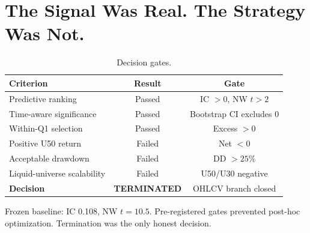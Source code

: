 \section{The Signal Was Real. The Strategy Was Not.}
\begin{table}[htbp]\centering
\caption{Decision gates.}\label{tab:gates}
\begin{tabular}{lcc}
\toprule
\textbf{Criterion} & \textbf{Result} & \textbf{Gate} \\
\midrule
Predictive ranking & Passed & IC $>0$, NW $t>2$ \\
Time-aware significance & Passed & Bootstrap CI excludes 0 \\
Within-Q1 selection & Passed & Excess $>0$ \\
Positive U50 return & Failed & Net $<0$ \\
Acceptable drawdown & Failed & DD $>25\%$ \\
Liquid-universe scalability & Failed & U50/U30 negative \\
\midrule
\textbf{Decision} & \textbf{TERMINATED} & OHLCV branch closed \\
\bottomrule
\end{tabular}
\end{table}
Frozen baseline: IC 0.108, NW $t = 10.5$. Pre-registered gates prevented post-hoc optimization. Termination was the only honest decision.
